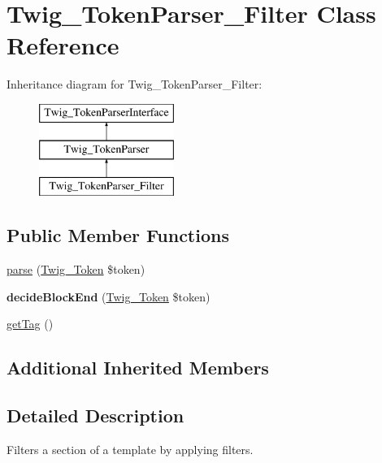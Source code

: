 \hypertarget{classTwig__TokenParser__Filter}{}\section{Twig\+\_\+\+Token\+Parser\+\_\+\+Filter Class Reference}
\label{classTwig__TokenParser__Filter}
Inheritance diagram for Twig\+\_\+\+Token\+Parser\+\_\+\+Filter\+:\begin{figure}[H]
\begin{center}
\leavevmode
\includegraphics[height=3.000000cm]{classTwig__TokenParser__Filter}
\end{center}
\end{figure}
\subsection*{Public Member Functions}
\begin{DoxyCompactItemize}
\item 
\hyperlink{classTwig__TokenParser__Filter_ab94f06e6d371c34f080432acfdd5e437}{parse} (\hyperlink{classTwig__Token}{Twig\+\_\+\+Token} \$token)
\item 
{\bfseries decide\+Block\+End} (\hyperlink{classTwig__Token}{Twig\+\_\+\+Token} \$token)\hypertarget{classTwig__TokenParser__Filter_a8d8800f75bc3446d32633e9f70b59ab2}{}\label{classTwig__TokenParser__Filter_a8d8800f75bc3446d32633e9f70b59ab2}

\item 
\hyperlink{classTwig__TokenParser__Filter_a860f5506b6704fdc54ab0fad9b118e2c}{get\+Tag} ()
\end{DoxyCompactItemize}
\subsection*{Additional Inherited Members}


\subsection{Detailed Description}
Filters a section of a template by applying filters.


